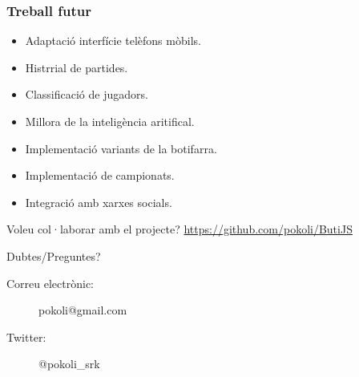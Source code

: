 \documentclass[notitlepage]{beamer}
\begin{document}
\begin{frame}
\frametitle{Treball futur}
\begin{itemize}
\item{Adaptació interfície telèfons mòbils.}
\item{Histrrial de partides.}
\item{Classificació de jugadors.}
\item{Millora de la inteligència aritifical.}
\item{Implementació variants de la botifarra.}
\item{Implementació de campionats.}
\item{Integració amb xarxes socials.}
\end{itemize}
\end{frame}


\begin{frame}
\begin{block}{Voleu col·laborar amb el projecte?}
\url{https://github.com/pokoli/ButiJS}
\end{block}

\begin{block}{Dubtes/Preguntes?}
\begin{description}
\item[Correu electrònic:]{pokoli@gmail.com}
\item[Twitter:]{@pokoli\_srk}
\end{description}
\end{block}

\end{frame}
\end{document}

